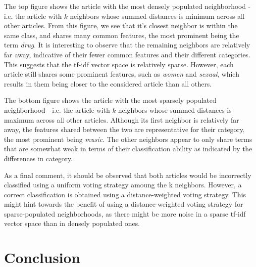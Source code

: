 \documentclass[11pt]{article}
\begin{document}
The top figure shows the article with the most densely populated neighborhood - i.e. the article with $k$ neighbors whose summed distances is minimum across all other articles.
From this figure, we see that it's closest neighbor is within the same class, and shares many common features, the most prominent being the term \emph{drug}.
It is interesting to observe that the remaining neighbors are relatively far away, indicative of their fewer common features and their different categories.
This suggests that the tf-idf vector space is relatively sparse.
However, each article still shares some prominent features, such as \emph{women} and \emph{sexual}, which results in them being closer to the considered article than all others.

The bottom figure shows the article with the most sparsely populated neighborhood - i.e. the article with $k$ neighbors whose summed distances is maximum across all other articles.
Although its first neighbor is relatively far away, the features shared between the two are representative for their category, the most prominent being \emph{music}.
The other neighbors appear to only share terms that are somewhat weak in terms of their classification ability as indicated by the differences in category.

As a final comment, it should be observed that both articles would be incorrectly classified using a uniform voting strategy amoung the k neighbors.
However, a correct classification is obtained using a distance-weighted voting strategy.
This might hint towards the benefit of using a distance-weighted voting strategy for sparse-populated neighborhoods, as there might be more noise in a sparse tf-idf vector space than in densely populated ones.

\section{Conclusion}
\end{document}
